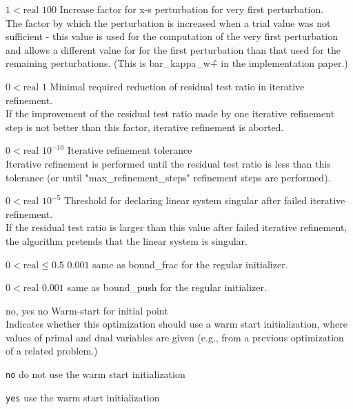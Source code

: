 %
{$1<\textrm{real}$}%
{$100$}%
{Increase factor for x-s perturbation for very first perturbation.\\
The factor by which the perturbation is increased when a trial value was not sufficient - this value is used for the computation of the very first perturbation and allows a different value for for the first perturbation than that used for the remaining perturbations. (This is bar\_kappa\_w\^+ in the implementation paper.)}%
{}

%
{$0<\textrm{real}$}%
{$1$}%
{Minimal required reduction of residual test ratio in iterative refinement.\\
If the improvement of the residual test ratio made by one iterative refinement step is not better than this factor, iterative refinement is aborted.}%
{}

%
{$0<\textrm{real}$}%
{$10^{-10}$}%
{Iterative refinement tolerance\\
Iterative refinement is performed until the residual test ratio is less than this tolerance (or until "max\_refinement\_steps" refinement steps are performed).}%
{}

%
{$0<\textrm{real}$}%
{$10^{- 5}$}%
{Threshold for declaring linear system singular after failed iterative refinement.\\
If the residual test ratio is larger than this value after failed iterative refinement, the algorithm pretends that the linear system is singular.}%
{}

%
{$0<\textrm{real}\leq0.5$}%
{$0.001$}%
{same as bound\_frac for the regular initializer.}%
{}

%
{$0<\textrm{real}$}%
{$0.001$}%
{same as bound\_push for the regular initializer.}%
{}

%
{\ttfamily no, yes}%
{no}%
{Warm-start for initial point\\
Indicates whether this optimization should use a warm start initialization, where values of primal and dual variables are given (e.g., from a previous optimization of a related problem.)}%
{\begin{list}{}{
\setlength{\parsep}{0em}
\setlength{\leftmargin}{5ex}
\setlength{\labelwidth}{2ex}
\setlength{\itemindent}{0ex}
\setlength{\topsep}{0pt}}
\item[\texttt{no}] do not use the warm start initialization
\item[\texttt{yes}] use the warm start initialization
\end{list}
}


